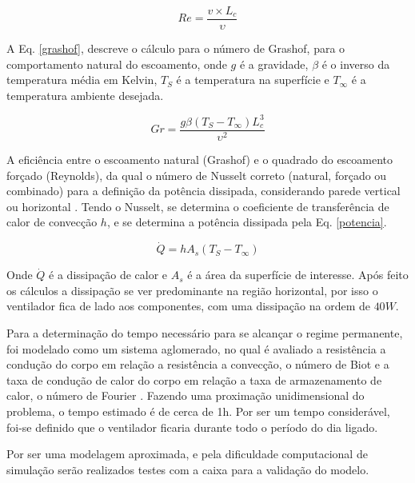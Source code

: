 \begin{equation}
	Re= \frac{v \times L_c}{\upsilon}
	\label{reynolds}
\end{equation}

A Eq. \ref{grashof}, descreve o cálculo para o número de Grashof, para o comportamento natural do escoamento, onde $g$ é a gravidade, $\beta$ é o inverso da temperatura média em Kelvin, $T_S$ é a temperatura na superfície e $T_{\infty}$ é a temperatura ambiente desejada.

\begin{equation}
	Gr= \frac{g \beta (T_S-T_{\infty})L_c^3}{\upsilon^2}
	\label{grashof}
\end{equation}

A eficiência entre o escoamento natural (Grashof) e o quadrado do escoamento forçado (Reynolds), da qual o número de Nusselt correto (natural, forçado ou combinado) para a definição da potência dissipada, considerando parede vertical ou horizontal \cite{livro_transcal}. Tendo o Nusselt, se determina o coeficiente de transferência de calor de convecção $h$, e se determina a potência dissipada pela Eq. \ref{potencia}.

\begin{equation}
	\dot{Q}= hA_s(T_S-T_{\infty})
	\label{potencia}
\end{equation}

Onde $\dot{Q}$ é a dissipação de calor e $A_s$ é a área da superfície de interesse. Após feito os cálculos a dissipação se ver predominante na região horizontal, por isso o ventilador fica de lado aos componentes, com uma dissipação na ordem de $40W$.

Para a determinação do tempo necessário para se alcançar o regime permanente, foi modelado como um sistema aglomerado, no qual é avaliado a resistência a condução do corpo em relação a resistência a convecção, o número de Biot e a taxa de condução de calor do corpo em relação a taxa de armazenamento de calor, o número de Fourier \cite{livro_transcal}. Fazendo uma proximação unidimensional do problema, o tempo estimado é de cerca de 1h. Por ser um tempo considerável, foi-se definido que o ventilador ficaria durante todo o período do dia ligado.


Por ser uma modelagem aproximada, e pela dificuldade computacional de simulação serão realizados testes com a caixa para a validação do modelo. 


